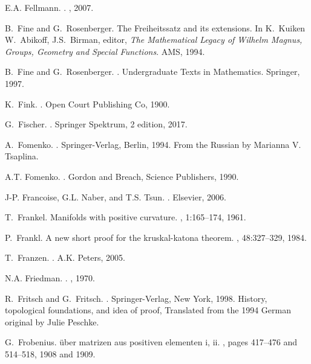 \documentclass[12pt]{amsart}
\begin{document}
\begin{thebibliography}{100}
E.A. Fellmann.
.
, 2007.

B.~Fine and G.~Rosenberger.
\newblock The {F}reiheitssatz and its extensions.
\newblock In K.~Kuiken W.~Abikoff, J.S.~Birman, editor, {\em The Mathematical
  Legacy of Wilhelm Magnus, Groups, Geometry and Special Functions}. AMS, 1994.

B.~Fine and G.~Rosenberger.
.
\newblock Undergraduate Texts in Mathematics. Springer, 1997.

K.~Fink.
.
\newblock Open Court Publishing Co, 1900.

G.~Fischer.
.
\newblock Springer Spektrum, 2 edition, 2017.

A.~Fomenko.
.
\newblock Springer-Verlag, Berlin, 1994.
\newblock From the Russian by Marianna V. Tsaplina.

A.T. Fomenko.
.
\newblock Gordon and Breach, Science Publishers, 1990.

J-P. Francoise, G.L. Naber, and T.S. Tsun.
.
\newblock Elsevier, 2006.

T.~Frankel.
\newblock Manifolds with positive curvature.
, 1:165--174, 1961.

P.~Frankl.
\newblock A new short proof for the kruskal-katona theorem.
, 48:327--329, 1984.

T.~Franzen.
.
\newblock A.K. Peters, 2005.

N.A. Friedman.
.
, 1970.

R.~Fritsch and G.~Fritsch.
.
\newblock Springer-Verlag, New York, 1998.
\newblock History, topological foundations, and idea of proof, Translated from
  the 1994 German original by Julie Peschke.

G.~Frobenius.
\newblock \"uber matrizen aus positiven elementen i, ii.
, pages 417--476 and 514--518,
  1908 and 1909.


\end{thebibliography}
\end{document}
